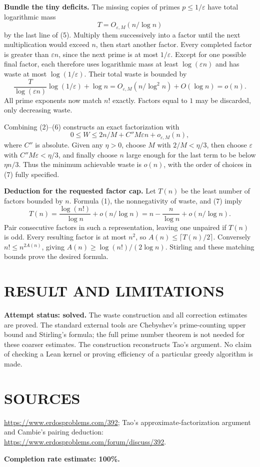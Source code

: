 \textbf{Bundle the tiny deficits.} The missing copies of primes $p\leq1/\varepsilon$ have total logarithmic mass
\[
T=O_{\varepsilon,M}(n/\log n)
\]
by the last line of (5). Multiply them successively into a factor until the next multiplication would exceed $n$, then start another factor. Every completed factor is greater than $\varepsilon n$, since the next prime is at most $1/\varepsilon$. Except for one possible final factor, each therefore uses logarithmic mass at least $\log(\varepsilon n)$ and has waste at most $\log(1/\varepsilon)$. Their total waste is bounded by
\[
\frac{T}{\log(\varepsilon n)}\log(1/\varepsilon)+\log n
=O_{\varepsilon,M}(n/\log^2 n)+O(\log n)=o(n).             \tag{6}
\]
All prime exponents now match $n!$ exactly. Factors equal to $1$ may be discarded, only decreasing waste.

Combining (2)--(6) constructs an exact factorization with
\[
0\leq W\leq 2n/M+C''M\varepsilon n+o_{\varepsilon,M}(n), \tag{7}
\]
where $C''$ is absolute. Given any $\eta>0$, choose $M$ with $2/M<\eta/3$, then choose $\varepsilon$ with $C''M\varepsilon<\eta/3$, and finally choose $n$ large enough for the last term to be below $\eta n/3$. Thus the minimum achievable waste is $o(n)$, with the order of choices in (7) fully specified.

\textbf{Deduction for the requested factor cap.} Let $T(n)$ be the least number of factors bounded by $n$. Formula (1), the nonnegativity of waste, and (7) imply
\[
T(n)=\frac{\log(n!)}{\log n}+o(n/\log n)
=n-\frac n{\log n}+o(n/\log n).
\]
Pair consecutive factors in such a representation, leaving one unpaired if $T(n)$ is odd. Every resulting factor is at most $n^2$, so $A(n)\leq\lceil T(n)/2\rceil$. Conversely $n!\leq n^{2A(n)}$, giving $A(n)\geq\log(n!)/(2\log n)$. Stirling and these matching bounds prove the desired formula.

\section{RESULT AND LIMITATIONS}
\textbf{Attempt status: solved.} The waste construction and all correction estimates are proved. The standard external tools are Chebyshev's prime-counting upper bound and Stirling's formula; the full prime number theorem is not needed for these coarser estimates. The construction reconstructs Tao's argument. No claim of checking a Lean kernel or proving efficiency of a particular greedy algorithm is made.

\section{SOURCES}
\url{https://www.erdosproblems.com/392}; Tao's approximate-factorization argument and Cambie's pairing deduction: \url{https://www.erdosproblems.com/forum/discuss/392}.

\textbf{Completion rate estimate: 100\%.}
